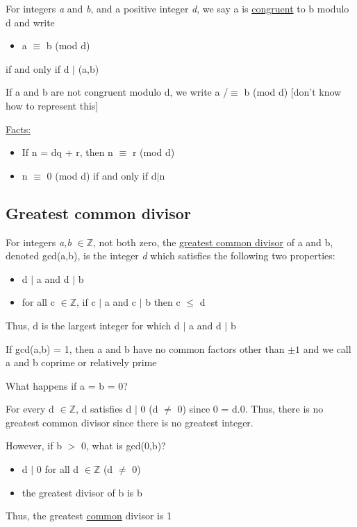 \documentclass{article}
\begin{document}
For integers \textit{a} and \textit{b}, and a positive integer \textit{d}, we say a is \underline{congruent} to b modulo d and write
\begin{itemize}
\item a $\equiv$ b (mod d)
\end{itemize}
if and only if d $|$ (a,b)

If a and b are not congruent modulo d, we write a /$\equiv$ b (mod d)
[don't know how to represent this]

\underline{Facts:}
\begin{itemize}
\item If n = dq + r, then n $\equiv$ r (mod d)
\item n $\equiv$ 0 (mod d) if and only if d$|$n
\end{itemize}

\subsection{Greatest common divisor}

For integers \textit{a,b} $\in \mathbb{Z}$, not both zero, the \underline{greatest common divisor} of a and b, denoted gcd(a,b), is the
integer \textit{d} which satisfies the following two properties:

\begin{itemize}
\item d $|$ a and d $|$ b
\item for all c $\in \mathbb{Z}$, if c $|$ a and c $|$ b then c $\leq$ d
\end{itemize}

Thus, d is the largest integer for which d $|$ a and d $|$ b

If gcd(a,b) = 1, then a and b have no common factors other than $\pm1$ and we call a and b coprime or relatively prime

What happens if a = b = 0?

For every d $\in \mathbb{Z}$, d satisfies d $|$ 0 (d $\neq$ 0) since 0 = d.0.
Thus, there is no greatest common divisor since there is no greatest integer.

However, if b $>$ 0, what is gcd(0,b)?
\begin{itemize}
\item d $|$ 0 for all d $\in \mathbb{Z}$ (d $\neq$ 0)
\item the greatest divisor of b is b
\end{itemize}

Thus, the greatest \underline{common} divisor is 1 \\
\end{document}

